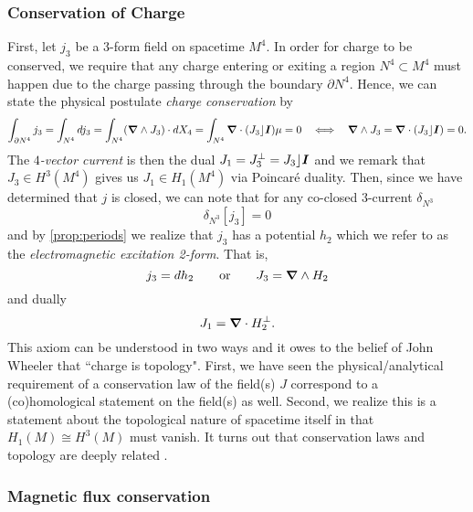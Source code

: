 \documentclass[conf]{new-aiaa}
\begin{document}
\subsubsection{Conservation of Charge}
First, let $j_3$ be a 3-form field on spacetime $M^4$. In order for charge to be conserved, we require that any charge entering or exiting a region $N^4 \subset M^4$ must happen due to the charge passing through the boundary $\partial N^4$. Hence, we can state the physical postulate \emph{charge conservation} by
\begin{equation}
    \label{eq:topological_charge_conservation}
    \int_{\partial N^4} j_3 = \int_{N^4} dj_3= \int_{N^4} (\boldsymbol{\nabla} \wedge J_3) \cdot dX_4 = \int_{N^4} \boldsymbol{\nabla} \cdot (J_3 \rfloor \boldsymbol{I}) \mu = 0    ~~\iff~~ \boldsymbol{\nabla} \wedge J_3=\boldsymbol{\nabla} \cdot (J_3 \rfloor \boldsymbol{I}) = 0.
\end{equation}
The \emph{$4$-vector current} is then the dual $J_1 = J_3^\perp=J_3 \rfloor \boldsymbol{I}$ and we remark that $J_3 \in H^3(M^4)$ gives us $J_1 \in H_1(M^4)$ via Poincar\'e duality. Then, since we have determined that $j$ is closed, we can note that for any co-closed $3$-current $\delta_{N^3}$
\begin{equation}
    \delta_{N^3}[j_3] = 0
\end{equation}
and by \cref{prop:periods} we realize that $j_3$ has a potential $h_2$ which we refer to as the \emph{electromagnetic excitation 2-form}. That is, 
\begin{equation}
    j_3=dh_2 \qquad \textrm{or} \qquad J_3 = \boldsymbol{\nabla} \wedge H_2
\end{equation}
and dually
\begin{equation}
\label{eq:current_from_excitation}
J_1 = \boldsymbol{\nabla} \cdot H_2^\perp.
\end{equation}
This axiom can be understood in two ways and it owes to the belief of John Wheeler that ``charge is topology". First, we have seen the physical/analytical requirement of a conservation law of the field(s) $J$ correspond to a (co)homological statement on the field(s) as well.  Second, we realize this is a statement about the topological nature of spacetime itself in that $H_1(M)\cong H^3(M)$ must vanish. It turns out that conservation laws and topology are deeply related \cite{westenholz_topological_nodate}.

\subsubsection{Magnetic flux conservation}
\end{document}
